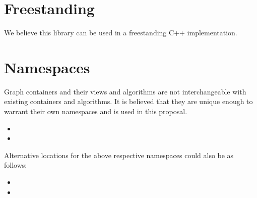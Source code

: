 \section{Freestanding}
We believe this library can be used in a freestanding C++ implementation.

\section{Namespaces}
Graph containers and their views and algorithms are not interchangeable with existing containers and algorithms.
It is believed that they are unique enough to warrant their own namespaces and is used in this proposal.
\begin{itemize}
\item[]
\item[]
\end{itemize}

\noindent
Alternative locations for the above respective namespaces could also be as follows:
\begin{itemize}
\item[]
\item[]
\end{itemize}
